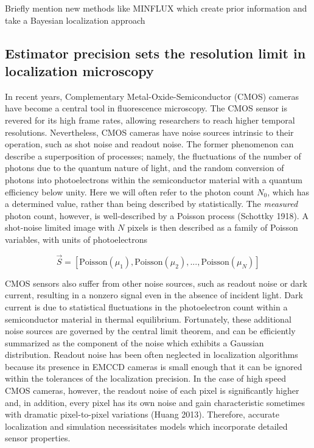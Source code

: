 \documentclass{ucetd}
\begin{document}
Briefly mention new methods like MINFLUX which create prior information and take a Bayesian localization approach


\subsection{Estimator precision sets the resolution limit in localization microscopy}

In recent years, Complementary Metal-Oxide-Semiconductor (CMOS) cameras have become a central tool in fluorescence microscopy. The CMOS sensor is revered for its high frame rates, allowing researchers to reach higher temporal resolutions. Nevertheless, CMOS cameras have noise sources intrinsic to their operation, such as shot noise and readout noise. The former phenomenon can describe a superposition of processes; namely, the fluctuations of the number of photons due to the quantum nature of light, and the random conversion of photons into photoelectrons within the semiconductor material with a quantum efficiency below unity. Here we will often refer to the photon count $N_{0}$, which has a determined value, rather than being described by statistically. The \emph{measured} photon count, however, is well-described by a Poisson process (Schottky 1918). A shot-noise limited image with $N$ pixels is then described as a family of Poisson variables, with units of photoelectrons


\begin{equation}
\vec{S} = \left[\mathrm{Poisson}(\mu_{1}), \mathrm{Poisson}(\mu_{2}), ..., \mathrm{Poisson}(\mu_{N})\right]
\end{equation}

CMOS sensors also suffer from other noise sources, such as readout noise or dark current, resulting in a nonzero signal even in the absence of incident light. Dark current is due to statistical fluctuations in the photoelectron count within a semiconductor material in thermal equilibrium. Fortunately, these additional noise sources are governed by the central limit theorem, and can be efficiently summarized as the component of the noise which exhibits a Gaussian distribution. Readout noise has been often neglected in localization algorithms because its presence in EMCCD cameras is small enough that it can be ignored within the tolerances of the localization precision. In the case of high speed CMOS cameras, however, the readout noise of each pixel is significantly higher and, in addition, every pixel has its own noise and gain characteristic sometimes with dramatic pixel-to-pixel variations (Huang 2013). Therefore, accurate localization and simulation necessisitates models which incorporate detailed sensor properties. 
\end{document}
